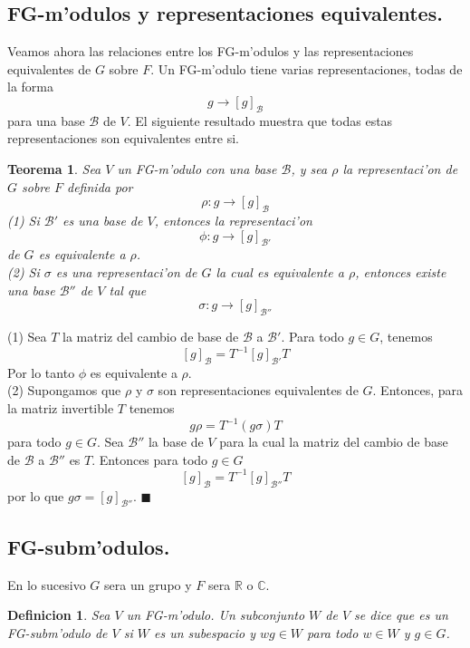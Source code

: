 \documentclass[a4paper,openright,12pt]{report}
\numberwithin{equation}{section} %
\newtheorem{teorema}{Teorema}[section] %
\newtheorem{definicion}{Definicion}[section] %
\newenvironment{proof}{\noindent{\it Demostracion:}}{\hfill$\blacksquare$} %
\begin{document}
\subsection{FG-m'odulos y representaciones equivalentes.}
Veamos ahora las relaciones entre los FG-m'odulos y las representaciones equivalentes de $G$ sobre $F$. Un FG-m'odulo tiene varias representaciones, todas de la forma
\[
g \rightarrow [g]_\mathscr{B}
\]
para una base $\mathscr{B}$ de $V$. El siguiente resultado muestra que todas estas representaciones son equivalentes entre si.
\begin{teorema}
Sea $V$ un FG-m'odulo con una base $\mathscr{B}$, y sea $\rho$ la representaci'on de $G$ sobre $F$ definida por
\[
\rho: g \rightarrow [g]_\mathscr{B}
\]
(1) Si $\mathscr{B}'$ es una base de $V$, entonces la representaci'on
\[
\phi: g \rightarrow [g]_\mathscr{B'}
\]
de $G$ es equivalente a $\rho$.\\
(2) Si $\sigma$ es una representaci'on de $G$ la cual es equivalente a $\rho$, entonces existe una base $\mathscr{B}''$
de $V$ tal que
\[
\sigma: g \rightarrow [g]_\mathscr{B''}
\]
\end{teorema}
\begin{proof}
(1) Sea $T$ la matriz del cambio de base de $\mathscr{B}$ a $\mathscr{B'}$. Para todo $g \in G$, tenemos
\[
[g]_{\mathscr{B}}=T^{-1}[g]_{\mathscr{B'}}T
\]
Por lo tanto $\phi$ es equivalente a $\rho$.\\
(2) Supongamos que $\rho$ y $\sigma$ son representaciones equivalentes de $G$. Entonces, para la matriz invertible $T$ tenemos
\[
g\rho = T^{-1}(g \sigma )T
\]
para todo $g \in G$. Sea $\mathscr{B''}$ la base de $V$ para la cual la matriz del cambio de base de $\mathscr{B}$ a $\mathscr{B''}$ es $T$. Entonces para todo $g \in G$
\[
[g]_{\mathscr{B}}=T^{-1}[g]_{\mathscr{B''}}T
\]
por lo que $g \sigma = [g]_\mathscr{B''}$.
\end{proof}
\subsection{FG-subm'odulos.}
En lo sucesivo $G$ sera un grupo y $F$ sera $\mathbb{R}$ o $\mathbb{C}$.
\begin{definicion}
Sea $V$ un FG-m'odulo. Un subconjunto $W$ de $V$ se dice que es un FG-subm'odulo de $V$ si $W$ es un subespacio y $wg \in W$ para todo $w \in W$ y $g \in G$. 
\end{definicion}
\end{document}
